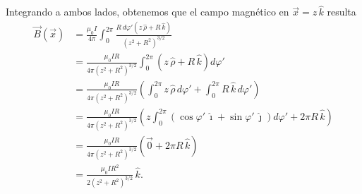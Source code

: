 \begin{ejemplo}
Integrando a ambos lados, obtenemos que el campo magnético en $\Vec{x} = z\,\hat{k}$ resulta
\begingroup
\allowdisplaybreaks
\begin{align*}
\vec{B}(\vec{x}) &= \frac{\mu_0 I}{4\pi} \int_{0}^{2\pi} \frac{R \,d\varphi' (z \,\hat{\rho} + R \,\hat{k})}{(z^2 + R^2)^{3/2}} \\
&= \frac{\mu_0 IR}{4\pi (z^2 + R^2)^{3/2}} \int_0^{2\pi} (z \,\hat{\rho} + R \,\hat{k}) d\varphi' \\
&= \frac{\mu_0 IR}{4\pi (z^2 + R^2)^{3/2}} \left(  \int_0^{2\pi} z \, \hat{\rho} \,d\varphi' + \int_0^{2\pi} R \,\hat{k} \,d\varphi' \right) \\
&= \frac{\mu_0 IR}{4\pi (z^2 + R^2)^{3/2}} \left(  z \int_0^{2\pi} ( \cos \varphi' \,\hat{\imath} + \sin \varphi' \, \hat{\jmath}) d\varphi' + 2\pi R\, \hat{k} \right) \\
&= \frac{\mu_0 IR}{4\pi (z^2 + R^2)^{3/2}} \left( \vec{0} + 2\pi R \,\hat{k} \right) \\
&= \frac{\mu_0 IR^2}{2(z^2 + R^2)^{3/2}}\, \hat{k}.    
\end{align*}
\endgroup

\end{ejemplo}

